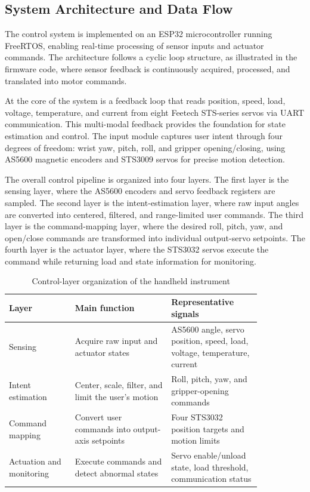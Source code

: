 \subsection{System Architecture and Data Flow}
The control system is implemented on an ESP32 microcontroller running FreeRTOS, enabling real-time processing of sensor inputs and actuator commands. The architecture follows a cyclic loop structure, as illustrated in the firmware code, where sensor feedback is continuously acquired, processed, and translated into motor commands.

At the core of the system is a feedback loop that reads position, speed, load, voltage, temperature, and current from eight Feetech STS-series servos via UART communication. This multi-modal feedback provides the foundation for state estimation and control. The input module captures user intent through four degrees of freedom: wrist yaw, pitch, roll, and gripper opening/closing, using AS5600 magnetic encoders and STS3009 servos for precise motion detection.

The overall control pipeline is organized into four layers. The first layer is the sensing layer, where the AS5600 encoders and servo feedback registers are sampled. The second layer is the intent-estimation layer, where raw input angles are converted into centered, filtered, and range-limited user commands. The third layer is the command-mapping layer, where the desired roll, pitch, yaw, and open/close commands are transformed into individual output-servo setpoints. The fourth layer is the actuator layer, where the STS3032 servos execute the command while returning load and state information for monitoring.

\begin{table}[htbp]
    \centering
    \caption{Control-layer organization of the handheld instrument}
    \label{tab:control_layers}
    \begin{tabular}{p{0.22\linewidth} p{0.32\linewidth} p{0.30\linewidth}}
        \toprule
        Layer & Main function & Representative signals \\
        \midrule
        Sensing & Acquire raw input and actuator states & AS5600 angle, servo position, speed, load, voltage, temperature, current \\
        Intent estimation & Center, scale, filter, and limit the user's motion & Roll, pitch, yaw, and gripper-opening commands \\
        Command mapping & Convert user commands into output-axis setpoints & Four STS3032 position targets and motion limits \\
        Actuation and monitoring & Execute commands and detect abnormal states & Servo enable/unload state, load threshold, communication status \\
        \bottomrule
    \end{tabular}
\end{table}

